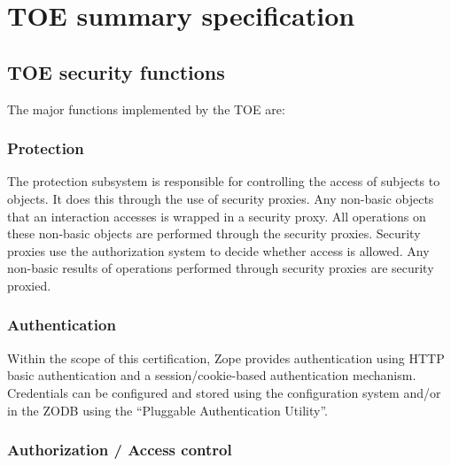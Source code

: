 \documentclass[12pt,english]{scrbook}
\begin{document}

\chapter{TOE summary specification}


\section{TOE security functions}  \label{toe-sec-funcs}


The major functions implemented by the TOE are:




\subsection{Protection}

The protection subsystem is responsible for controlling the access of subjects
to objects.  It does this through the use of security proxies.  Any non-basic
objects that an interaction accesses is wrapped in a security proxy.  All
operations on these non-basic objects are performed through the security
proxies. Security proxies use the authorization system to decide whether access
is allowed.  Any non-basic results of operations performed through security
proxies are security proxied.




\subsection{Authentication}

Within the scope of this certification, Zope provides authentication using
HTTP basic authentication and a session/cookie-based authentication mechanism.
Credentials can be configured and stored using the configuration system and/or
in the ZODB using the ``Pluggable Authentication Utility''.




\subsection{Authorization / Access control}
\end{document}
